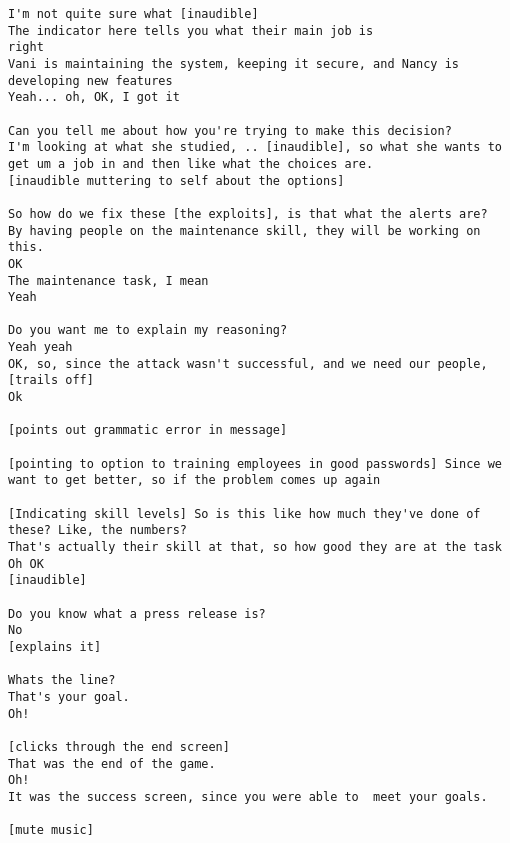 \begin{lstlisting}
I'm not quite sure what [inaudible]
The indicator here tells you what their main job is
right
Vani is maintaining the system, keeping it secure, and Nancy is developing new features
Yeah... oh, OK, I got it

Can you tell me about how you're trying to make this decision?
I'm looking at what she studied, .. [inaudible], so what she wants to get um a job in and then like what the choices are.
[inaudible muttering to self about the options]

So how do we fix these [the exploits], is that what the alerts are?
By having people on the maintenance skill, they will be working on this.
OK
The maintenance task, I mean
Yeah

Do you want me to explain my reasoning?
Yeah yeah
OK, so, since the attack wasn't successful, and we need our people, [trails off]
Ok

[points out grammatic error in message]

[pointing to option to training employees in good passwords] Since we want to get better, so if the problem comes up again

[Indicating skill levels] So is this like how much they've done of these? Like, the numbers?
That's actually their skill at that, so how good they are at the task
Oh OK
[inaudible]

Do you know what a press release is?
No
[explains it]

Whats the line?
That's your goal.
Oh!

[clicks through the end screen]
That was the end of the game.
Oh!
It was the success screen, since you were able to  meet your goals.

[mute music]


\end{lstlisting}
